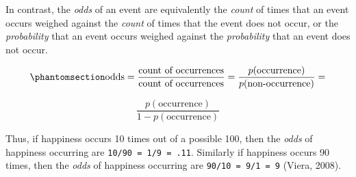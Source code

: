 \documentclass[
  letterpaper,
  DIV=11,
  numbers=noendperiod]{scrreprt}
\begin{document}
In contrast, the \emph{odds} of an event are equivalently the
\emph{count} of times that an event occurs weighed against the
\emph{count} of times that the event does not occur, or the
\emph{probability} that an event occurs weighed against the
\emph{probability} that an event does not occur.

\begin{equation}\phantomsection\label{eq-odds-definition}{\text{odds} = \frac{\text{count of occurrences}}{\text{count of occurrences}} = \frac{p(\text{occurrence})}{p(\text{non-occurrence})} =}\end{equation}

\[\frac{p(\text{occurrence})}{1-p(\text{occurrence})}\]

Thus, if happiness occurs 10 times out of a possible 100, then the
\emph{odds} of happiness occurring are \texttt{10/90\ =\ 1/9\ =\ .11}.
Similarly if happiness occurs 90 times, then the \emph{odds} of
happiness occurring are \texttt{90/10\ =\ 9/1\ =\ 9} (Viera, 2008).
\end{document}
